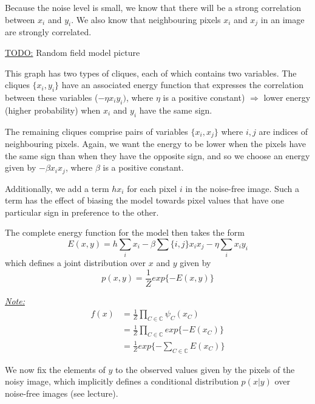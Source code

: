 \documentclass{scrartcl}
\begin{document}
\begin{appendices}
Because the noise level is small, we know that there will be a strong correlation between \(x_i\) and \(y_i\). We also know that neighbouring pixels \(x_i\) and \(x_j\) in an image are strongly correlated.

\underline{TODO:} Random field model picture

This graph has two types of cliques, each of which contains two variables. The cliques \(\{x_i, y_i\}\) have an associated energy function that expresses the correlation between these variables (\(-\eta x_i y_i)\), where \(\eta\) is a positive constant) \(\Rightarrow\) lower energy (higher probability) when \(x_i\) and \(y_i\) have the same sign.

The remaining cliques comprise pairs of variables \(\{x_i, x_j\}\) where \(i, j\) are indices of neighbouring pixels. Again, we want the energy to be lower when the pixels have the same sign than when they have the opposite sign, and so we choose an energy given by \(-\beta x_i x_j\), where \(\beta\) is a positive constant.

Additionally, we add a term \(hx_i\) for each pixel \(i\) in the noise-free image. Such a term has the effect of biasing the model towards pixel values that have one particular sign in preference to the other.

The complete energy function for the model then takes the form
\[E(x,y) = h \sum_i x_i - \beta \sum{\{i,j\}} x_ix_j - \eta \sum_i x_i y_i\]
which defines a joint distribution over \(x\) and \(y\) given by
\[p(x,y) = \frac{1}{Z} exp\{-E(x,y)\}\]

\underline{\textit{Note:}}
\begin{align*}
    f(x) &= \frac{1}{Z} \prod_{C \in \mathbb{C}} \psi_C(x_C)\\
    &= \frac{1}{Z} \prod_{C \in \mathbb{C}} exp\{-E(x_C)\}\\
    &= \frac{1}{Z} exp\{-\sum_{C \in \mathbb{C}}E(x_C)\}
\end{align*}

We now fix the elements of \(y\) to the observed values given by the pixels of the noisy image, which implicitly defines a conditional distribution \(p(x|y)\) over noise-free images (see lecture).

\end{appendices}
\end{document}
